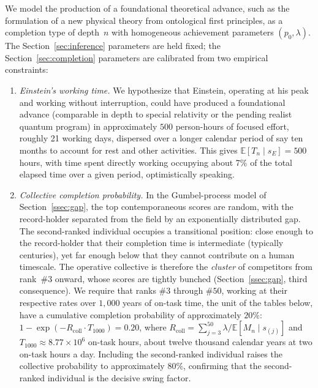 \documentclass{article}
\begin{document}
We model the production of a foundational theoretical advance, such as
the formulation of a new physical theory from ontological first
principles, as a completion type of depth~$n$ with homogeneous
achievement parameters $(p_0, \lambda)$. The Section~\ref{sec:inference}
parameters are held fixed; the Section~\ref{sec:completion} parameters
are calibrated from two empirical constraints:
\begin{enumerate}
  \item[\textbf{E1.}]
    \emph{Einstein's working time.}\;
    We hypothesize that Einstein, operating at his peak and working
    without interruption, could have produced a foundational advance
    (comparable in depth to special relativity or the pending \cite{spekkens2010einstein} realist quantum program) in approximately $500$
    person-hours of focused effort, roughly 21 working days, dispersed
    over a longer calendar period of say ten months to account for rest and other
    activities. This gives $\mathbb{E}[T_n \mid s_E] = 500$ hours, with time spent directly working occupying about 7\% of the total elapsed time over a given period, optimistically speaking.
  \item[\textbf{E2.}]
    \emph{Collective completion probability.}\;
    In the Gumbel-process model of Section~\ref{ssec:gap}, the top
    contemporaneous scores are random, with the record-holder separated
    from the field by an exponentially distributed gap. The second-ranked
    individual occupies a transitional position: close enough to the
    record-holder that their completion time is intermediate (typically
    centuries), yet far enough below that they cannot contribute on a
    human timescale. The operative collective is therefore the
    \emph{cluster} of competitors from rank~$\#3$ onward, whose scores
    are tightly bunched (Section~\ref{ssec:gap}, third consequence).
    We require that ranks $\#3$ through $\#50$, working at their respective rates over $1{,}000$ years of on-task time, the unit of the tables below, have a cumulative completion
    probability of approximately $20\%$:
    $1 - \exp(-R_{\mathrm{coll}} \cdot T_{1000}) = 0.20$, where
    $R_{\mathrm{coll}} = \sum_{j=3}^{50} \lambda / \mathbb{E}[M_n \mid s_{(j)}]$
    and $T_{1000} \approx 8.77 \times 10^6$ on-task hours, about twelve thousand calendar years at two on-task hours a day. Including the
    second-ranked individual raises the collective probability to
    approximately $80\%$, confirming that the second-ranked individual is
    the decisive swing factor.
\end{enumerate}
\end{document}
